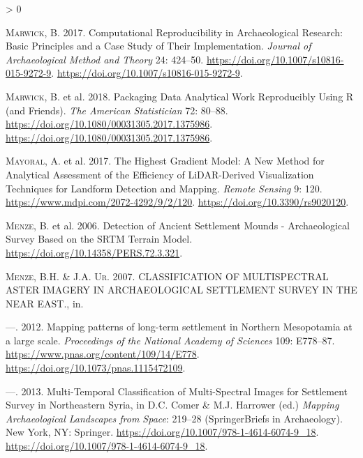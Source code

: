 \documentclass[
  12pt,
]{article}
\newlength{\cslhangindent}
\newenvironment{CSLReferences}[2] %
 {%
  \setlength{\parindent}{0pt}
  \ifodd #1 \everypar{\setlength{\hangindent}{\cslhangindent}}\ignorespaces\fi
  \ifnum #2 > 0
  \setlength{\parskip}{#2\baselineskip}
  \fi
 }%
 {}
\begin{document}
\begin{CSLReferences}{1}{0}
\leavevmode\hypertarget{ref-marwickComputationalReproducibilityArchaeological2017b}{}%
\textsc{Marwick}, B. 2017. Computational {Reproducibility} in {Archaeological} {Research}: {Basic} {Principles} and a {Case} {Study} of {Their} {Implementation}. \emph{Journal of Archaeological Method and Theory} 24: 424--50. \url{https://doi.org/10.1007/s10816-015-9272-9}. \url{https://doi.org/10.1007/s10816-015-9272-9}.

\leavevmode\hypertarget{ref-marwickPackagingDataAnalytical2018a}{}%
\textsc{Marwick}, B. et al. 2018. Packaging {Data} {Analytical} {Work} {Reproducibly} {Using} {R} (and {Friends}). \emph{The American Statistician} 72: 80--88. \url{https://doi.org/10.1080/00031305.2017.1375986}. \url{https://doi.org/10.1080/00031305.2017.1375986}.

\leavevmode\hypertarget{ref-mayoralHighestGradientModel2017a}{}%
\textsc{Mayoral}, A. et al. 2017. The {Highest} {Gradient} {Model}: {A} {New} {Method} for {Analytical} {Assessment} of the {Efficiency} of {LiDAR}-{Derived} {Visualization} {Techniques} for {Landform} {Detection} and {Mapping}. \emph{Remote Sensing} 9: 120. \url{https://www.mdpi.com/2072-4292/9/2/120}. \url{https://doi.org/10.3390/rs9020120}.

\leavevmode\hypertarget{ref-menzeDetectionAncientSettlement2006a}{}%
\textsc{Menze}, B. et al. 2006. Detection of {Ancient} {Settlement} {Mounds} - {Archaeological} {Survey} {Based} on the {SRTM} {Terrain} {Model}. \url{https://doi.org/10.14358/PERS.72.3.321}.

\leavevmode\hypertarget{ref-Menze2007CLASSIFICATIONOM}{}%
\textsc{Menze}, B.H. \& J.A. \textsc{Ur}. 2007. {CLASSIFICATION} {OF} {MULTISPECTRAL} {ASTER} {IMAGERY} {IN} {ARCHAEOLOGICAL} {SETTLEMENT} {SURVEY} {IN} {THE} {NEAR} {EAST}., in.

\leavevmode\hypertarget{ref-menzeMappingPatternsLongterm2012a}{}%
---. 2012. Mapping patterns of long-term settlement in {Northern} {Mesopotamia} at a large scale. \emph{Proceedings of the National Academy of Sciences} 109: E778--87. \url{https://www.pnas.org/content/109/14/E778}. \url{https://doi.org/10.1073/pnas.1115472109}.

\leavevmode\hypertarget{ref-menzeMultiTemporalClassificationMultiSpectral2013b}{}%
---. 2013. Multi-{Temporal} {Classification} of {Multi}-{Spectral} {Images} for {Settlement} {Survey} in {Northeastern} {Syria}, in D.C. Comer \& M.J. Harrower (ed.) \emph{Mapping {Archaeological} {Landscapes} from {Space}}: 219--28 ({SpringerBriefs} in {Archaeology}). New York, NY: Springer. \url{https://doi.org/10.1007/978-1-4614-6074-9_18}. \url{https://doi.org/10.1007/978-1-4614-6074-9_18}.


\end{CSLReferences}
\end{document}
